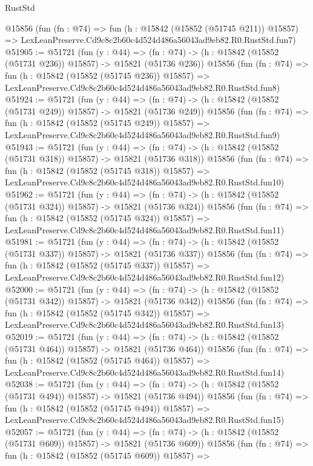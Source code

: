 \begin{lexlean}{RustStd}
\begin{coremodule}
    @15856
    (fun (fn : @74) =>
    fun (h : @15842 (@15852 (@51745 @211)) @15857) =>
    LexLeanPreserve.Cd9c8c2b60c4d524d486a56043ad9eb82.R0.RustStd.fun7)
@51905 := @51721
    (fun (y : @44) =>
    (fn : @74) -> (h : @15842 (@15852 (@51731 @236)) @15857) -> @15821 (@51736 @236))
    @15856
    (fun (fn : @74) =>
    fun (h : @15842 (@15852 (@51745 @236)) @15857) =>
    LexLeanPreserve.Cd9c8c2b60c4d524d486a56043ad9eb82.R0.RustStd.fun8)
@51924 := @51721
    (fun (y : @44) =>
    (fn : @74) -> (h : @15842 (@15852 (@51731 @249)) @15857) -> @15821 (@51736 @249))
    @15856
    (fun (fn : @74) =>
    fun (h : @15842 (@15852 (@51745 @249)) @15857) =>
    LexLeanPreserve.Cd9c8c2b60c4d524d486a56043ad9eb82.R0.RustStd.fun9)
@51943 := @51721
    (fun (y : @44) =>
    (fn : @74) -> (h : @15842 (@15852 (@51731 @318)) @15857) -> @15821 (@51736 @318))
    @15856
    (fun (fn : @74) =>
    fun (h : @15842 (@15852 (@51745 @318)) @15857) =>
    LexLeanPreserve.Cd9c8c2b60c4d524d486a56043ad9eb82.R0.RustStd.fun10)
@51962 := @51721
    (fun (y : @44) =>
    (fn : @74) -> (h : @15842 (@15852 (@51731 @324)) @15857) -> @15821 (@51736 @324))
    @15856
    (fun (fn : @74) =>
    fun (h : @15842 (@15852 (@51745 @324)) @15857) =>
    LexLeanPreserve.Cd9c8c2b60c4d524d486a56043ad9eb82.R0.RustStd.fun11)
@51981 := @51721
    (fun (y : @44) =>
    (fn : @74) -> (h : @15842 (@15852 (@51731 @337)) @15857) -> @15821 (@51736 @337))
    @15856
    (fun (fn : @74) =>
    fun (h : @15842 (@15852 (@51745 @337)) @15857) =>
    LexLeanPreserve.Cd9c8c2b60c4d524d486a56043ad9eb82.R0.RustStd.fun12)
@52000 := @51721
    (fun (y : @44) =>
    (fn : @74) -> (h : @15842 (@15852 (@51731 @342)) @15857) -> @15821 (@51736 @342))
    @15856
    (fun (fn : @74) =>
    fun (h : @15842 (@15852 (@51745 @342)) @15857) =>
    LexLeanPreserve.Cd9c8c2b60c4d524d486a56043ad9eb82.R0.RustStd.fun13)
@52019 := @51721
    (fun (y : @44) =>
    (fn : @74) -> (h : @15842 (@15852 (@51731 @464)) @15857) -> @15821 (@51736 @464))
    @15856
    (fun (fn : @74) =>
    fun (h : @15842 (@15852 (@51745 @464)) @15857) =>
    LexLeanPreserve.Cd9c8c2b60c4d524d486a56043ad9eb82.R0.RustStd.fun14)
@52038 := @51721
    (fun (y : @44) =>
    (fn : @74) -> (h : @15842 (@15852 (@51731 @494)) @15857) -> @15821 (@51736 @494))
    @15856
    (fun (fn : @74) =>
    fun (h : @15842 (@15852 (@51745 @494)) @15857) =>
    LexLeanPreserve.Cd9c8c2b60c4d524d486a56043ad9eb82.R0.RustStd.fun15)
@52057 := @51721
    (fun (y : @44) =>
    (fn : @74) -> (h : @15842 (@15852 (@51731 @609)) @15857) -> @15821 (@51736 @609))
    @15856
    (fun (fn : @74) =>
    fun (h : @15842 (@15852 (@51745 @609)) @15857) =>

\end{coremodule}
\end{lexlean}
